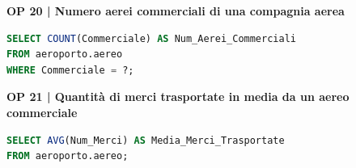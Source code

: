 
\textbf{\small OP 20 | Numero aerei commerciali di una compagnia aerea}\\

\begin{lstlisting}[language=SQL]
SELECT COUNT(Commerciale) AS Num_Aerei_Commerciali
FROM aeroporto.aereo
WHERE Commerciale = ?;
\end{lstlisting}


\textbf{\small OP 21 | Quantità di merci trasportate in media da un aereo commerciale}\\

\begin{lstlisting}[language=SQL]
SELECT AVG(Num_Merci) AS Media_Merci_Trasportate
FROM aeroporto.aereo;	
\end{lstlisting}